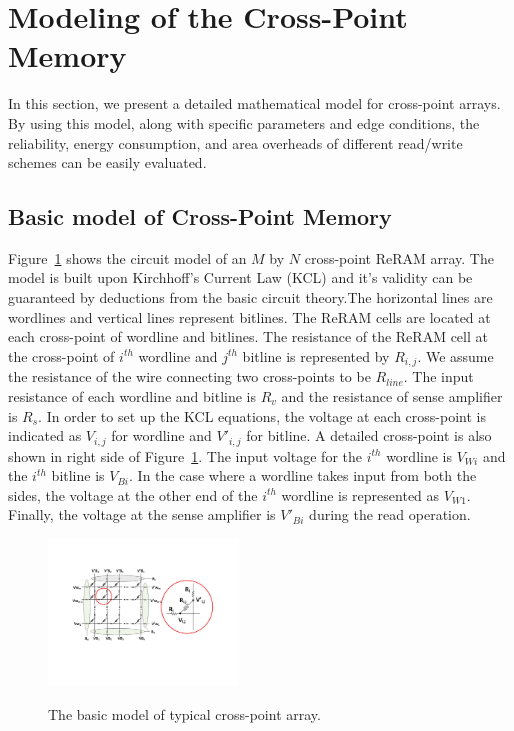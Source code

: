 \vspace{10pt}
\section{Modeling of the Cross-Point Memory}\label{sec:model}

In this section, we present a detailed mathematical model for cross-point
arrays. By using this model, along with specific parameters and edge
conditions, the reliability, energy consumption, and area overheads of
different read/write schemes can be easily evaluated.

\subsection{Basic model of Cross-Point Memory}
Figure~\ref{fig:modeling} shows the circuit model of an $M$ by $N$
cross-point ReRAM array. The model is built upon Kirchhoff's Current Law
(KCL) and it's validity can be guaranteed by deductions from the basic
circuit theory.The horizontal lines are wordlines and vertical lines
represent bitlines. The ReRAM cells are located at each cross-point of
wordline and bitlines. The resistance of the ReRAM cell at the cross-point
of $i^{th}$ wordline and $j^{th}$ bitline is represented by $R_{i,j}$. We
assume the resistance of the wire connecting two cross-points to be
$R_{line}$. The input resistance of each wordline and bitline is $R_v$ and
the resistance of sense amplifier is $R_s$. In order to set up the KCL
equations, the voltage at each cross-point is indicated as $V_{i,j}$ for
wordline and $V'_{i,j}$ for bitline. A detailed cross-point is also shown
in right side of Figure~\ref{fig:modeling}. The input voltage for the
$i^{th}$ wordline is $V_{Wi}$ and the $i^{th}$ bitline is $V_{Bi}$. In the
case where a wordline takes input from both the sides, the voltage at the
other end of the $i^{th}$ wordline is represented as $V_{W1}$. Finally,
the voltage at the sense amplifier is $V'_{Bi}$ during the read operation.


\begin{figure}%
\centering
  \includegraphics[width=0.45\textwidth]{./figures/model_f.pdf}\\
  \caption{The basic model of typical cross-point array.}\label{fig:modeling}
  \vspace{-12pt}
\end{figure}


